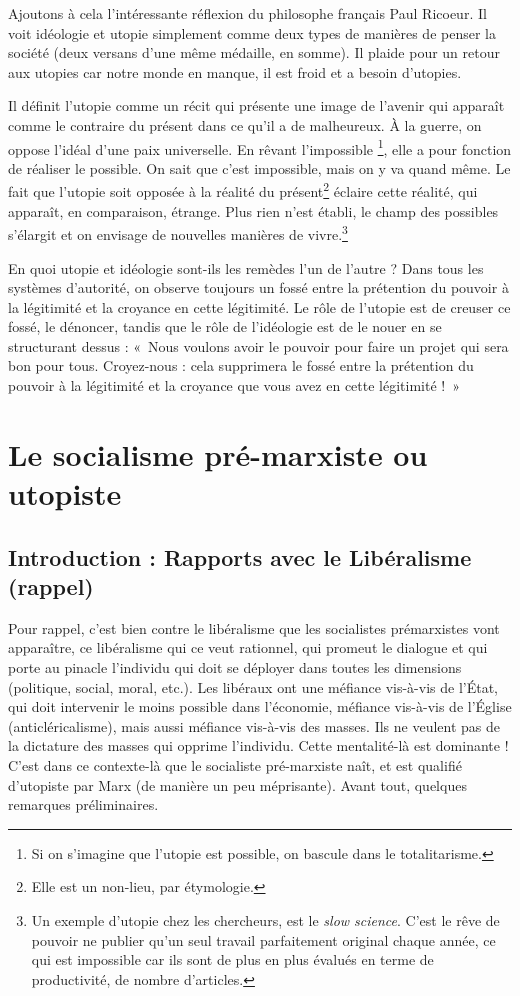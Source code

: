 \documentclass[12pt]{report}
\begin{document}
Ajoutons à cela l'intéressante réflexion du philosophe français Paul Ricoeur. Il voit idéologie et utopie simplement comme deux types de manières de penser la société (deux versans d'une même médaille, en somme). Il plaide pour un retour aux utopies car notre monde en manque, il est froid et a besoin d'utopies.

Il définit l'utopie comme un récit qui présente une image de l'avenir qui apparaît comme le contraire du présent dans ce qu'il a de malheureux. À la guerre, on oppose l'idéal d'une paix universelle. En rêvant l'impossible \footnote{Si on s'imagine que l'utopie est possible, on bascule dans le totalitarisme.}, elle a pour fonction de réaliser le possible. On sait que c'est impossible, mais on y va quand même.
Le fait que l'utopie soit opposée à la réalité du présent\footnote{Elle est un non-lieu, par étymologie.} éclaire cette réalité, qui apparaît, en comparaison, étrange. Plus rien n'est établi, le champ des possibles s'élargit et on envisage de nouvelles manières de vivre.\footnote{Un exemple d'utopie chez les chercheurs, est le \emph{slow science}. C'est le rêve de pouvoir ne publier qu'un seul travail parfaitement original chaque année, ce qui est impossible car ils sont de plus en plus évalués en terme de productivité, de nombre d'articles.}

En quoi utopie et idéologie sont-ils les remèdes l'un de l'autre ?
Dans tous les systèmes d'autorité, on observe toujours un fossé entre la prétention du pouvoir à la légitimité et la croyance en cette légitimité. Le rôle de l'utopie est de creuser ce fossé, le dénoncer, tandis que le rôle de l'idéologie est de le nouer en se structurant dessus : «~Nous voulons avoir le pouvoir pour faire un projet qui sera bon pour tous. Croyez-nous : cela supprimera le fossé entre la prétention du pouvoir à la légitimité et la croyance que vous avez en cette légitimité !~»



\section{Le socialisme pré-marxiste ou utopiste}

\subsection*{Introduction : Rapports avec le Libéralisme (rappel)}

Pour rappel, c'est bien contre le libéralisme que les socialistes prémarxistes vont apparaître, ce libéralisme qui ce veut rationnel, qui promeut le dialogue et qui porte au pinacle l'individu qui doit se déployer dans toutes les dimensions (politique, social, moral, etc.). Les libéraux ont une méfiance vis-à-vis de l'État, qui doit intervenir le moins possible dans l'économie, méfiance vis-à-vis de l'Église (anticléricalisme), mais aussi méfiance vis-à-vis des masses. Ils ne veulent pas de la dictature des masses qui opprime l'individu. Cette mentalité-là est dominante ! C'est dans ce contexte-là que le socialiste pré-marxiste naît, et est qualifié d'utopiste par Marx (de manière un peu méprisante).
Avant tout, quelques remarques préliminaires.
\end{document}
